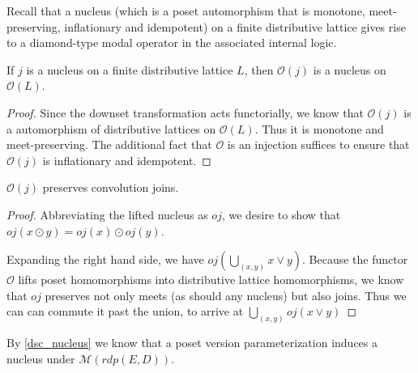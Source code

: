 \documentclass[hoptionsi,review,format=sigplan]{acmart}
\theoremstyle{definition}
\newcommand{\Mcc}{\mathcal{M}}
\newcommand{\Oc}{\mathcal{O}}
\begin{document}
Recall that a nucleus (which is a poset automorphism that is monotone, meet-preserving, inflationary and idempotent) on a finite distributive lattice gives rise to a diamond-type modal operator in the associated internal logic. 

\begin{lemma}
If \(j\) is a nucleus on a finite distributive lattice \(L\), then \(\Oc(j)\) is a nucleus on \(\Oc(L)\).
\end{lemma}

\begin{proof}
Since the downset transformation acts functorially, we know that \(\Oc(j)\) is a automorphism of distributive lattices on \(\Oc(L)\). Thus it is monotone and meet-preserving. The additional fact that \(\Oc\) is an injection suffices to ensure that \(\Oc(j)\) is inflationary and idempotent.
\end{proof}

\begin{lemma}
\(\Oc(j)\) preserves convolution joins.
\end{lemma}
\begin{proof}
Abbreviating the lifted nucleus as \(oj\), we desire to show that \(oj(x \odot y) = oj(x) \odot oj(y)\).

Expanding the right hand side, we have  \(oj(\bigcup_{(x,y)} x \vee y)\). Because the functor \(\Oc\) lifts poset homomorphisms into distributive lattice homomorphisms, we know that \(oj\) preserves not only meets (as should any nucleus) but also joins. Thus we can can commute it past the union, to arrive at \(\bigcup_{(x,y)} oj(x \vee y)\)

\end{proof}

By \ref{dsc_nucleus} we know that a poset version parameterization induces a nucleus under \(\Mcc(rdp(E,D))\).










\end{document}

